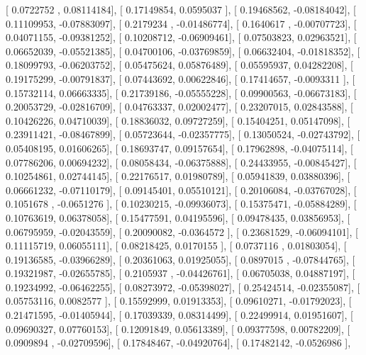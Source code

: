 \documentclass{article}
\begin{document}
       [ 0.0722752 ,  0.08114184],
       [ 0.17149854,  0.0595037 ],
       [ 0.19468562, -0.08184042],
       [ 0.11109953, -0.07883097],
       [ 0.2179234 , -0.01486774],
       [ 0.1640617 , -0.00707723],
       [ 0.04071155, -0.09381252],
       [ 0.10208712, -0.06909461],
       [ 0.07503823,  0.02963521],
       [ 0.06652039, -0.05521385],
       [ 0.04700106, -0.03769859],
       [ 0.06632404, -0.01818352],
       [ 0.18099793, -0.06203752],
       [ 0.05475624,  0.05876489],
       [ 0.05595937,  0.04282208],
       [ 0.19175299, -0.00791837],
       [ 0.07443692,  0.00622846],
       [ 0.17414657, -0.0093311 ],
       [ 0.15732114,  0.06663335],
       [ 0.21739186, -0.05555228],
       [ 0.09900563, -0.06673183],
       [ 0.20053729, -0.02816709],
       [ 0.04763337,  0.02002477],
       [ 0.23207015,  0.02843588],
       [ 0.10426226,  0.04710039],
       [ 0.18836032,  0.09727259],
       [ 0.15404251,  0.05147098],
       [ 0.23911421, -0.08467899],
       [ 0.05723644, -0.02357775],
       [ 0.13050524, -0.02743792],
       [ 0.05408195,  0.01606265],
       [ 0.18693747,  0.09157654],
       [ 0.17962898, -0.04075114],
       [ 0.07786206,  0.00694232],
       [ 0.08058434, -0.06375888],
       [ 0.24433955, -0.00845427],
       [ 0.10254861,  0.02744145],
       [ 0.22176517,  0.01980789],
       [ 0.05941839,  0.03880396],
       [ 0.06661232, -0.07110179],
       [ 0.09145401,  0.05510121],
       [ 0.20106084, -0.03767028],
       [ 0.1051678 , -0.0651276 ],
       [ 0.10230215, -0.09936073],
       [ 0.15375471, -0.05884289],
       [ 0.10763619,  0.06378058],
       [ 0.15477591,  0.04195596],
       [ 0.09478435,  0.03856953],
       [ 0.06795959, -0.02043559],
       [ 0.20090082, -0.0364572 ],
       [ 0.23681529, -0.06094101],
       [ 0.11115719,  0.06055111],
       [ 0.08218425,  0.0170155 ],
       [ 0.0737116 ,  0.01803054],
       [ 0.19136585, -0.03966289],
       [ 0.20361063,  0.01925055],
       [ 0.0897015 , -0.07844765],
       [ 0.19321987, -0.02655785],
       [ 0.2105937 , -0.04426761],
       [ 0.06705038,  0.04887197],
       [ 0.19234992, -0.06462255],
       [ 0.08273972, -0.05398027],
       [ 0.25424514, -0.02355087],
       [ 0.05753116,  0.0082577 ],
       [ 0.15592999,  0.01913353],
       [ 0.09610271, -0.01792023],
       [ 0.21471595, -0.01405944],
       [ 0.17039339,  0.08314499],
       [ 0.22499914,  0.01951607],
       [ 0.09690327,  0.07760153],
       [ 0.12091849,  0.05613389],
       [ 0.09377598,  0.00782209],
       [ 0.0909894 , -0.02709596],
       [ 0.17848467, -0.04920764],
       [ 0.17482142, -0.0526986 ],
\end{document}
